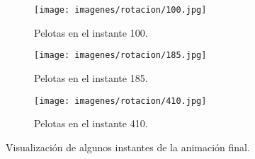 \begin{figure}[H]
    \centering 
	\begin{subfigure}[t]{0.48\textwidth}
	    \centering
	    \texttt{[image: imagenes/rotacion/100.jpg]}
        \caption{Pelotas en el instante 100.}
    \end{subfigure}
    \hfill 
	\begin{subfigure}[t]{0.48\textwidth}
	    \centering
	    \texttt{[image: imagenes/rotacion/185.jpg]}
        \caption{Pelotas en el instante 185.}
    \end{subfigure}    
    \par\bigskip
	\begin{subfigure}[t]{0.48\textwidth}
	    \centering
	    \texttt{[image: imagenes/rotacion/410.jpg]}
        \caption{Pelotas en el instante 410.}
    \end{subfigure}        
    \caption{Visualización de algunos instantes de la animación final.}
\end{figure}